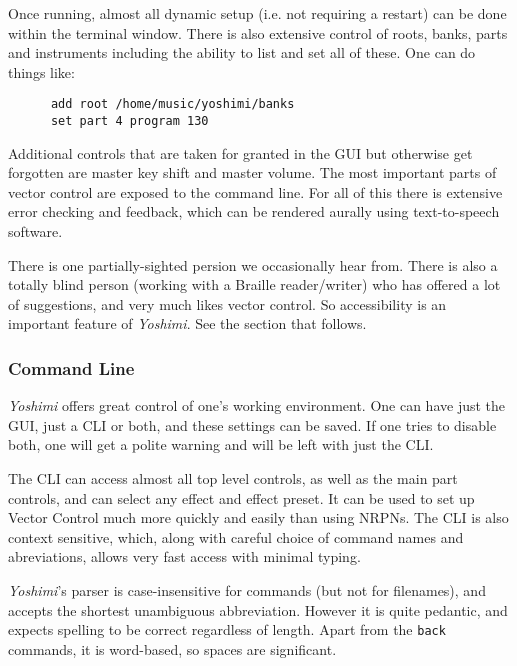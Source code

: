 \documentclass[
 11pt,
 twoside,
 a4paper,
 final                                 %
]{article}
\begin{document}
   Once running, almost all dynamic setup (i.e. not requiring a restart) can
   be done within the terminal window. There is also extensive control of
   roots, banks, parts and instruments including the ability to list and set
   all of these. One can do things like:

   \begin{verbatim}
      add root /home/music/yoshimi/banks
      set part 4 program 130
   \end{verbatim}

   Additional controls that are taken for granted in the GUI but
   otherwise get forgotten are master key shift and master volume.  The
   most important parts of vector control are exposed to the command line.
   For all of this there is extensive error checking and feedback, which can be
   rendered aurally using text-to-speech software.

   There is one partially-sighted persion we occasionally hear from. There
   is also a totally blind person (working with a Braille reader/writer) who has
   offered a lot of suggestions, and very much likes vector control.  So
   accessibility  is an important feature of
   \textsl{Yoshimi}.  See the section that follows.
   
\subsubsection{Command Line}
\label{subsubsec:new_features_command_line}

   \textsl{Yoshimi} offers great control of one's working environment.
   One can have just the
   GUI, just a CLI or both, and these settings can be saved. If one tries to
   disable both, one will get a polite warning and will be left with just the
   CLI.

   The CLI can access almost all top level controls, as well as the main
   part controls, and can select any effect and effect preset.
   It can be used to set up Vector
   Control much more quickly and easily than using NRPNs.  The CLI is also
   context sensitive, which, along with careful choice of command names and
   abreviations, allows very fast access with minimal typing.

   \textsl{Yoshimi}'s parser is case-insensitive for commands (but not for
   filenames), and accepts the shortest unambiguous abbreviation. However it is
   quite pedantic, and expects spelling to be correct regardless of length.
   Apart from the \texttt{back} commands, it is word-based, so spaces are
   significant.
\end{document}
